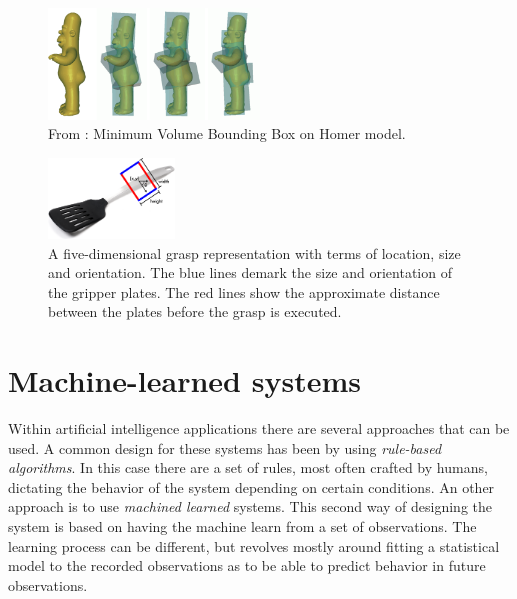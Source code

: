 \begin{figure}
	\centering
	\includegraphics[width=0.5\textwidth]{img/related-work/mvbb.png}
	\caption{From \parencite{Huebner2008}: Minimum Volume Bounding Box on Homer model.}
	\label{fig:rel__mvbb}
\end{figure}

\begin{figure}
	\centering
	\includegraphics[width=0.3\textwidth]{img/related-work/grasp-representation.png}
	\caption{A five-dimensional grasp representation with terms of location, size and orientation. The blue lines demark the size and orientation of the gripper plates. The red lines show the approximate distance between the plates before the grasp is executed.}
	\label{fig:grasp-representation}
\end{figure}


\section{Machine-learned systems}
\label{sec:machine_learned_systems}
Within artificial intelligence applications there are several approaches that can be used. A common design for these systems has been by using \emph{rule-based algorithms}. In this case there are a set of rules, most often crafted by humans, dictating the behavior of the system depending on certain conditions. An other approach is to use \emph{machined learned} systems. This second way of designing the system is based on having the machine learn from a set of observations. The learning process can be different, but revolves mostly around fitting a statistical model to the recorded observations as to be able to predict behavior in future observations.

